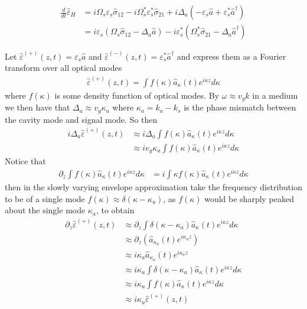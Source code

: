 \documentclass[aps,pra,showpacs,amsmath,amssymb,nofootinbib,longbibliography,superscriptaddress
]{revtex4-1}
\theoremstyle{definition}
\theoremstyle{remark}
\newcommand{\0}{\hat{0}}
\begin{document}
\begin{align}\label{varepsilonEq1}
    \frac{d}{dt}\hat{\varepsilon}_H
    &=
    i \Omega_{s} \varepsilon_s \hat{\sigma}_{12} - i \Omega_{s}^* \varepsilon_s^* \hat{\sigma}_{21} +
    i \Delta_a \left(-\varepsilon_s \hat{a} + \varepsilon_s^* \hat{a}^{\dagger}\right)\nonumber \\
    &=
    i \varepsilon_s \left(\Omega_{s} \hat{\sigma}_{12} - \Delta_a \hat{a}\right) - i \varepsilon_s^* \left(\Omega_{s}^* \hat{\sigma}_{21} - \Delta_a \hat{a}^{\dagger}\right)
\end{align}

Let $\hat{\varepsilon}^{(+)}(z,t) = \varepsilon_s \hat{a}$ and $\hat{\varepsilon}^{(-)}(z,t) = \varepsilon_s^* \hat{a}^{\dagger}$ and express them as a Fourier transform over all optical modes
\begin{align}
    \hat{\varepsilon}^{(+)}(z,t) = \int f(\kappa) \hat{a}_{\kappa}(t) e^{i \kappa z} d\kappa
\end{align}
where $f(\kappa)$ is some density function of optical modes. By $\omega \approx v_g k$ in a medium we then have that $\Delta_a \approx v_g \kappa_a$ where $\kappa_a = k_a - k_s$ is the phase mismatch between the cavity mode and signal mode. So then
\begin{align}
    i \Delta_a \hat{\varepsilon}^{(+)}(z,t)
    &\approx i \Delta_a \int f(\kappa) \hat{a}_{\kappa}(t) e^{i \kappa z} d\kappa \nonumber \\
    &\approx i v_g \kappa_a \int f(\kappa) \hat{a}_{\kappa}(t) e^{i \kappa z} d\kappa
\end{align}
Notice that
\begin{align}
    \partial_z \int f(\kappa) \hat{a}_{\kappa}(t) e^{i \kappa z} d\kappa
    &= i \int \kappa f(\kappa) \hat{a}_{\kappa}(t) e^{i \kappa z} d\kappa
\end{align}
then in the slowly varying envelope approximation take the frequency distribution to be of a single mode $f(\kappa) \approx \delta(\kappa - \kappa_a)$, as $f(\kappa)$ would be sharply peaked about the single mode $\kappa_a$, to obtain
\begin{align}
    \partial_z \hat{\varepsilon}^{(+)}(z,t)
    &\approx
    \partial_z \int \delta(\kappa - \kappa_a) \hat{a}_{\kappa}(t) e^{i \kappa z} d\kappa \nonumber \\
    &\approx
    \partial_z \left( \hat{a}_{\kappa_a}(t) e^{i \kappa_a z} \right)\nonumber \\
    &\approx i \kappa_a \hat{a}_{\kappa_a}(t) e^{i \kappa_a z} \nonumber \\
    &\approx i \kappa_a \int \delta(\kappa - \kappa_a) \hat{a}_{\kappa}(t) e^{i \kappa z} d\kappa \nonumber\\
    &\approx i \kappa_a \int f(\kappa) \hat{a}_{\kappa}(t) e^{i \kappa z} d\kappa \nonumber\\
    &\approx i \kappa_a \hat{\varepsilon}^{(+)}(z,t)
\end{align}
\end{document}
